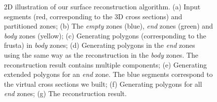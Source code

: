 \begin{figure} [htbp]
{\begin{minipage}[b]{0.23\textwidth}
    \end{minipage}}
  \caption{2D illustration of our surface reconstruction algorithm.
  (a) Input segments (red, corresponding to the 3D cross sections) and partitioned zones;
  (b) The \textit{empty} zones (blue), \textit{end} zones (green) and \textit{body} zones (yellow);
  (c) Generating polygons (corresponding to the frusta) in \textit{body} zones;
  (d) Generating polygons in the \textit{end} zones using the same way as the reconstruction in the \textit{body} zones. The reconstruction result contains multiple components;
  (e) Generating extended polygons for an \textit{end} zone. The blue segments correspond to the virtual cross sections we built;
  (f) Generating polygons for all \textit{end} zones;
  (g) The reconstruction result. }
  \label{fig:workflow2d}
\end{figure}

